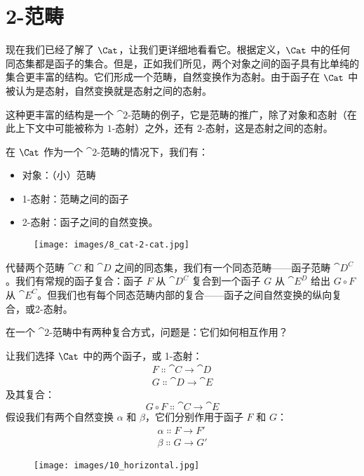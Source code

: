 \section{2-范畴}

现在我们已经了解了 $\Cat$，让我们更详细地看看它。根据定义，$\Cat$ 中的任何同态集都是函子的集合。但是，正如我们所见，两个对象之间的函子具有比单纯的集合更丰富的结构。它们形成一个范畴，自然变换作为态射。由于函子在 $\Cat$ 中被认为是态射，自然变换就是态射之间的态射。

这种更丰富的结构是一个 $\cat{2}$-范畴的例子，它是范畴的推广，除了对象和态射（在此上下文中可能被称为 $1$-态射）之外，还有 $2$-态射，这是态射之间的态射。

在 $\Cat$ 作为一个 $\cat{2}$-范畴的情况下，我们有：

\begin{itemize}
  \tightlist
  \item
  对象：（小）范畴
  \item
  1-态射：范畴之间的函子
  \item
  2-态射：函子之间的自然变换。
\end{itemize}

\begin{figure}[H]
  \centering
  \texttt{[image: images/8\_cat-2-cat.jpg]}
\end{figure}

\noindent
代替两个范畴 $\cat{C}$ 和 $\cat{D}$ 之间的同态集，我们有一个同态范畴——函子范畴 $\cat{D^C}$。我们有常规的函子复合：函子 $F$ 从 $\cat{D^C}$ 复合到一个函子 $G$ 从 $\cat{E^D}$ 给出 $G \circ F$ 从 $\cat{E^C}$。但我们也有每个同态范畴内部的复合——函子之间自然变换的纵向复合，或2-态射。

在一个 $\cat{2}$-范畴中有两种复合方式，问题是：它们如何相互作用？

让我们选择 $\Cat$ 中的两个函子，或 1-态射：
\begin{gather*}
  F \Colon \cat{C} \to \cat{D} \\
  G \Colon \cat{D} \to \cat{E}
\end{gather*}
及其复合：
\[G \circ F \Colon \cat{C} \to \cat{E}\]
假设我们有两个自然变换 $\alpha$ 和 $\beta$，它们分别作用于函子 $F$ 和 $G$：
\begin{gather*}
  \alpha \Colon F \to F' \\
  \beta \Colon G \to G'
\end{gather*}

\begin{figure}[H]
  \centering
  \texttt{[image: images/10\_horizontal.jpg]}
\end{figure}


